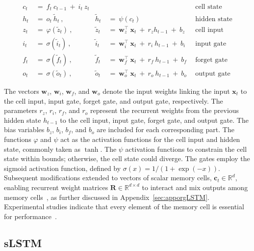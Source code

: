 \begin{align}
c_t \ &= \  f_t \ c_{t-1} \ + \ i_t \ z_t &  & &\text{cell state} \\
h_t  \ &= \ o_t \ \tilde{h}_t \ , & \tilde{h}_t \ &= \ \psi \left( c_t\right)
  &\text{hidden state} \\
z_t \ &= \ \varphi \left( \tilde{z}_t \right) \ , 
  &\tilde{z}_t \ &=  \ \mathbf{w}^\top_{z} \ \mathbf{x}_t \ + \
  r_{z}  h_{t-1} \ + \  b_{z} \ \
  &\text{cell input} \\
i_t \ &= \ \sigma \left( \tilde{i}_t  \right) \ , 
  &\tilde{i}_t \ &= \ \mathbf{w}^\top_{i} \ \mathbf{x}_t \ + \
  r_{i}  \ h_{t-1} \ + \  b_{i} \ \
  &\text{input gate} \\
f_t \ &= \ \sigma \left(  \tilde{f}_t \right) \ , 
  &\tilde{f}_t \ &= \ \mathbf{w}^\top_{f} \ \mathbf{x}_t  \ + \
  r_{f}  \ h_{t-1} \ + \  b_{f} \ \
  &\text{forget gate} \\
o_t \ &= \ \sigma \left( \tilde{o}_t \right) \ , 
  &\tilde{o}_t  \ &= \ \mathbf{w}^\top_{o} \ \mathbf{x}_t \ + \
  r_{o}  \ h_{t-1} \ + \  b_{o} \ \
  &\text{output gate} 
\end{align}

The vectors $\mathbf{w}_{z}$, $\mathbf{w}_{i}$,
$\mathbf{w}_{f}$, and $\mathbf{w}_{o}$ denote the input weights linking the input $\mathbf{x}_t$ to the cell input, input gate, forget gate, and output gate, respectively. The parameters $r_{z}$, $r_{i}$, $r_{f}$, and $r_{o}$ represent the recurrent weights from the previous hidden state $h_{t-1}$ to the cell input, input gate, forget gate, and output gate. The bias variables $b_{z}$, $b_{i}$, $b_{f}$, and $b_{o}$ are included for each corresponding part. The functions $\varphi$ and $\psi$ act as the activation functions for the cell input and hidden state, commonly taken as $\tanh$. The $\psi$ activation functions to constrain the cell state within bounds; otherwise, the cell state could diverge. The gates employ the sigmoid activation function, defined by $\sigma \left( x \right)= 1/(1+\exp(-x))$. Subsequent modifications extended to vectors of scalar memory cells, $\mathbf{c}_t \in \mathbb{R}^{d}$, enabling recurrent weight matrices $\mathbf{R} \in \mathbb{R}^{d \times d}$ to interact and mix outputs among memory cells~\citep{Greff:15}, as further discussed in Appendix~\ref{sec:apporgLSTM}. Experimental studies indicate that every element of the memory cell is essential for performance~\citep{Greff:15}.

\subsection{sLSTM}
\label{sec:sLSTM}

